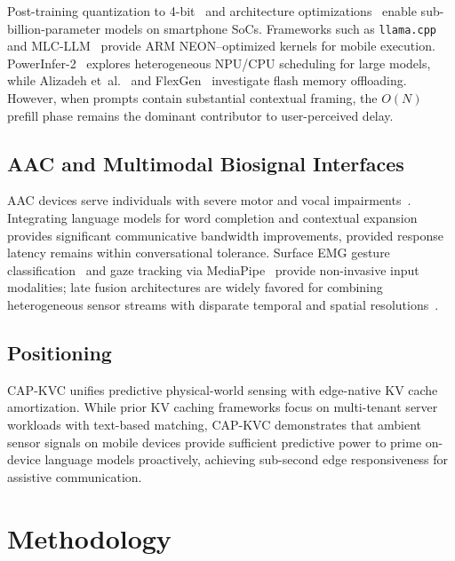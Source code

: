 \documentclass[journal]{IEEEtran}
\begin{document}
Post-training quantization to 4-bit~\cite{dettmers2022,frantar2022} and architecture optimizations~\cite{mobilellm} enable sub-billion-parameter models on smartphone SoCs. Frameworks such as \texttt{llama.cpp}~\cite{llamacpp} and MLC-LLM~\cite{mlcllm} provide ARM NEON--optimized kernels for mobile execution. PowerInfer-2~\cite{powerinfer2} explores heterogeneous NPU/CPU scheduling for large models, while Alizadeh et~al.~\cite{llminaflash} and FlexGen~\cite{flexgen} investigate flash memory offloading. However, when prompts contain substantial contextual framing, the $O(N)$ prefill phase remains the dominant contributor to user-perceived delay.

\subsection{AAC and Multimodal Biosignal Interfaces}
\label{sec:related_aac}

AAC devices serve individuals with severe motor and vocal impairments~\cite{beukelman2020}. Integrating language models for word completion and contextual expansion~\cite{vertanen2015} provides significant communicative bandwidth improvements, provided response latency remains within conversational tolerance. Surface EMG gesture classification~\cite{ninapro} and gaze tracking via MediaPipe~\cite{mediapipe} provide non-invasive input modalities; late fusion architectures are widely favored for combining heterogeneous sensor streams with disparate temporal and spatial resolutions~\cite{ngiam2011}.

\subsection{Positioning}
\label{sec:positioning}

CAP-KVC unifies predictive physical-world sensing with edge-native KV cache amortization. While prior KV caching frameworks focus on multi-tenant server workloads with text-based matching, CAP-KVC demonstrates that ambient sensor signals on mobile devices provide sufficient predictive power to prime on-device language models proactively, achieving sub-second edge responsiveness for assistive communication.

\section{Methodology}
\label{sec:methodology}
\end{document}

